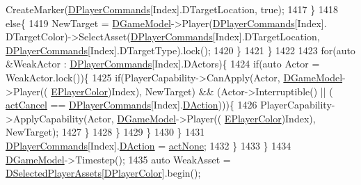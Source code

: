 \begin{DoxyCode}
      CreateMarker(\hyperlink{classCApplicationData_a2df1addeb7622233f72dc056bbcf31a1}{DPlayerCommands}[Index].DTargetLocation, \textcolor{keyword}{true});
1417                     \}
1418                     \textcolor{keywordflow}{else}\{
1419                         NewTarget = \hyperlink{classCApplicationData_a32b50c7c1cbac3cfd67c7f775b1d6fee}{DGameModel}->Player(\hyperlink{classCApplicationData_a2df1addeb7622233f72dc056bbcf31a1}{DPlayerCommands}[Index].
      DTargetColor)->SelectAsset(\hyperlink{classCApplicationData_a2df1addeb7622233f72dc056bbcf31a1}{DPlayerCommands}[Index].DTargetLocation, 
      \hyperlink{classCApplicationData_a2df1addeb7622233f72dc056bbcf31a1}{DPlayerCommands}[Index].DTargetType).lock();
1420                     \}
1421                 \}
1422                 
1423                 \textcolor{keywordflow}{for}(\textcolor{keyword}{auto} &WeakActor : \hyperlink{classCApplicationData_a2df1addeb7622233f72dc056bbcf31a1}{DPlayerCommands}[Index].DActors)\{
1424                     \textcolor{keywordflow}{if}(\textcolor{keyword}{auto} Actor = WeakActor.lock())\{
1425                         \textcolor{keywordflow}{if}(PlayerCapability->CanApply(Actor, \hyperlink{classCApplicationData_a32b50c7c1cbac3cfd67c7f775b1d6fee}{DGameModel}->Player((
      \hyperlink{GameDataTypes_8h_aafb0ca75933357ff28a6d7efbdd7602f}{EPlayerColor})Index), NewTarget) && (Actor->Interruptible() || (
      \hyperlink{GameDataTypes_8h_a35b98ce26aca678b03c6f9f76e4778ceaec5e11ffc62be241b4f6673586b35a6b}{actCancel} == \hyperlink{classCApplicationData_a2df1addeb7622233f72dc056bbcf31a1}{DPlayerCommands}[Index].\hyperlink{structSPlayerCommandRequest_a80897bbccf2c4e0b148a7aa815a926c6}{DAction})))\{
1426                             PlayerCapability->ApplyCapability(Actor, \hyperlink{classCApplicationData_a32b50c7c1cbac3cfd67c7f775b1d6fee}{DGameModel}->Player((
      \hyperlink{GameDataTypes_8h_aafb0ca75933357ff28a6d7efbdd7602f}{EPlayerColor})Index), NewTarget);
1427                         \}
1428                     \}
1429                 \}
1430             \}
1431             \hyperlink{classCApplicationData_a2df1addeb7622233f72dc056bbcf31a1}{DPlayerCommands}[Index].\hyperlink{structSPlayerCommandRequest_a80897bbccf2c4e0b148a7aa815a926c6}{DAction} = \hyperlink{GameDataTypes_8h_a35b98ce26aca678b03c6f9f76e4778ceaa8df154ad276f6f62054e9b5b0696f92}{actNone};
1432         \}
1433     \}
1434     \hyperlink{classCApplicationData_a32b50c7c1cbac3cfd67c7f775b1d6fee}{DGameModel}->Timestep();
1435     \textcolor{keyword}{auto} WeakAsset = \hyperlink{classCApplicationData_a05c1087d5a5c4ddc14fcb37444f1642b}{DSelectedPlayerAssets}[\hyperlink{classCApplicationData_a53550939b20cba70570f113e4d1c5d02}{DPlayerColor}].begin();

\end{DoxyCode}
